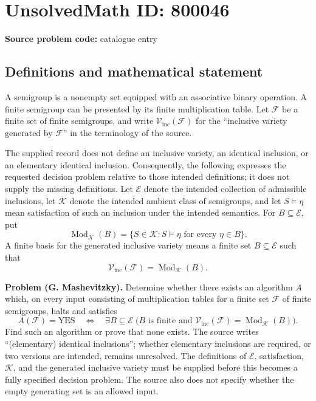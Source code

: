 \documentclass[11pt]{article}
\begin{document}
\section*{UnsolvedMath ID: 800046}
\textbf{Source problem code:} catalogue entry
\subsection{Definitions and mathematical statement}
A semigroup is a nonempty set equipped with an associative binary operation. A finite semigroup can be presented by its finite multiplication table. Let \(\mathcal F\) be a finite set of finite semigroups, and write \(\mathcal V_{\mathrm{inc}}(\mathcal F)\) for the ``inclusive variety generated by \(\mathcal F\)'' in the terminology of the source.

The supplied record does not define an inclusive variety, an identical inclusion, or an elementary identical inclusion. Consequently, the following expresses the requested decision problem relative to those intended definitions; it does not supply the missing definitions. Let \(\mathcal E\) denote the intended collection of admissible inclusions, let \(\mathcal K\) denote the intended ambient class of semigroups, and let \(S\models\eta\) mean satisfaction of such an inclusion under the intended semantics. For \(B\subseteq\mathcal E\), put
\[
\operatorname{Mod}_{\mathcal K}(B)
=\{S\in\mathcal K: S\models\eta\text{ for every }\eta\in B\}.
\]
A finite basis for the generated inclusive variety means a finite set \(B\subseteq\mathcal E\) such that
\[
\mathcal V_{\mathrm{inc}}(\mathcal F)=\operatorname{Mod}_{\mathcal K}(B).
\]

\textbf{Problem (G. Mashevitzky).} Determine whether there exists an algorithm \(A\) which, on every input consisting of multiplication tables for a finite set \(\mathcal F\) of finite semigroups, halts and satisfies
\[
A(\mathcal F)=\mathrm{YES}
\quad\Longleftrightarrow\quad
\exists B\subseteq\mathcal E\;
\bigl(B\text{ is finite and }
\mathcal V_{\mathrm{inc}}(\mathcal F)=\operatorname{Mod}_{\mathcal K}(B)\bigr).
\]
Find such an algorithm or prove that none exists. The source writes ``(elementary) identical inclusions''; whether elementary inclusions are required, or two versions are intended, remains unresolved. The definitions of \(\mathcal E\), satisfaction, \(\mathcal K\), and the generated inclusive variety must be supplied before this becomes a fully specified decision problem. The source also does not specify whether the empty generating set is an allowed input.
\end{document}
